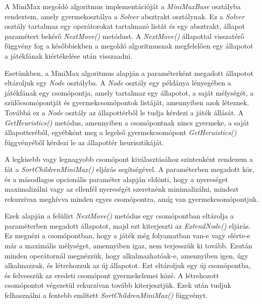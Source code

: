 \documentclass[
]{thesis-ekf}
\theoremstyle{definition}
\theoremstyle{remark}
\begin{document}
A MiniMax megoldó algoritmus implementációját a \emph{MiniMaxBase} osztályba rendeztem, amely gyermekosztálya a \emph{Solver} absztrakt osztálynak. Ez a \emph{Solver} osztály tartalmaz egy operátorokat tartalmazó listát és egy absztrakt, állapot paramétert bekérő \emph{NextMove()} metódust. A \emph{NextMove()} állapottal visszatérő függvény fog a későbbiekben a megoldó algoritmusnak megfelelően egy állapotot a játékfának kiértékelése után visszaadni.



Esetünkben, a MiniMax algoritmus alapján a paraméterként megadott állapotot eltároljuk egy \emph{Node} osztályba. A \emph{Node} osztály egy példánya lényegében a játékfának egy csomópontja, amely tartalmaz egy állapotot, a saját mélységét, a szülőcsomópontját és gyermekcsomópontok listáját, amennyiben azok léteznek. Továbbá ez a \emph{Node} osztály az állapottérből le tudja kérdezi a játék állását. A \emph{GetHeuristics()} metódus, amennyiben a csomópontnak nincs gyermeke, a saját állapotteréből, egyébként meg a legelső gyermekcsomópont \emph{GetHeruistics()} függvényéből kérdezi le az állapottér heurisztikáját. 

A legkisebb vagy legnagyobb csomópont kiválasztásához szintenként rendezem a fát a \emph{SortChildrenMiniMax()} eljárás segítségével. A paraméterben megadott kör, és a másodlagos opcionális paraméter alapján eldönti, hogy a nyereséget maximalizálni vagy  az ellenfél nyereségét szeretnénk minimalizálni, mindezt rekurzívan meghívva minden egyes csomópontra, amíg van gyermekcsomópontjuk.



Ezek alapján a felülírt \emph{NextMove()} metódus egy csomópontban eltárolja a paraméterben megadott állapotot, majd ezt kiterjeszti az \emph{ExtendNode()} eljárás. Ez megnézi a csomópontban, hogy a játék még folyamatban van-e vagy elérte-e már a maximális mélységet, amennyiben igaz, nem terjesszük ki tovább. Ezután minden operátornál megnézzük, hogy alkalmazhatóak-e, amennyiben igen, úgy alkalmazzuk, és létrehozzuk az új állapotot. Ezt eltároljuk egy új csomópontba, és felvesszük az eredeti csomópont gyermekelemei közé. A létrehozott csomópontot végezetül rekurzívan tovább kiterjesztjük. Ezek után tudjuk felhasználni a fentebb említett \emph{SortChildrenMiniMax()} függvényt.
\end{document}
